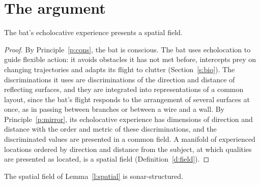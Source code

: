 \documentclass{situationist-preprint}
\begin{document}
\section{The argument}\label{s:argument}

\begin{lemma}\label{l:spatial}
The bat's echolocative experience presents a spatial field.
\end{lemma}

\begin{proof}
By Principle~\ref{p:cons}, the bat is conscious. The bat uses echolocation to guide flexible action: it avoids obstacles it has not met before, intercepts prey on changing trajectories and adapts its flight to clutter (Section~\ref{s:bio}). The discriminations it uses are discriminations of the direction and distance of reflecting surfaces, and they are integrated into representations of a common layout, since the bat's flight responds to the arrangement of several surfaces at once, as in passing between branches or between a wire and a wall. By Principle~\ref{p:mirror}, its echolocative experience has dimensions of direction and distance with the order and metric of these discriminations, and the discriminated values are presented in a common field. A manifold of experienced locations ordered by direction and distance from the subject, at which qualities are presented as located, is a spatial field (Definition~\ref{d:field}).
\end{proof}

\begin{lemma}\label{l:sonar}
The spatial field of Lemma~\ref{l:spatial} is sonar-structured.
\end{lemma}
\end{document}
